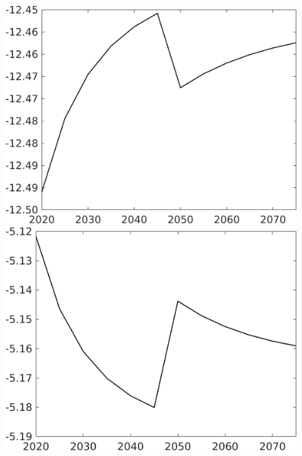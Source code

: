 \documentclass[12pt]{article}
\begin{document}
\begin{figure}[h!!]
\begin{minipage}[]{0.32\textwidth}
		\includegraphics[width=1\textwidth]{../../codding_model/own_basedOnFried/optimalPol_010922_revision/figures/all_13Sept22/CompTaufPER_bytaul_Equlab_Reg0_hh_spillover0_nsk0_xgr0_knspil0_sep1_LFlimit1_emsbase0_countec0_GovRev0_etaa0.79_lgd0.png}
	\end{minipage}	
	\begin{minipage}[]{0.32\textwidth}
		\includegraphics[width=1\textwidth]{../../codding_model/own_basedOnFried/optimalPol_010922_revision/figures/all_13Sept22/CompTaufPER_bytaul_Equlab_Reg0_hl_spillover0_nsk0_xgr0_knspil0_sep1_LFlimit1_emsbase0_countec0_GovRev0_etaa0.79_lgd0.png}
	\end{minipage}	

\end{figure}
\end{document}
